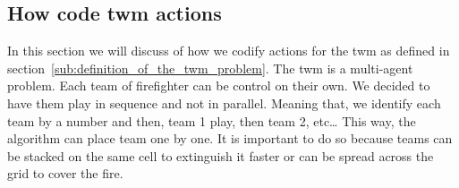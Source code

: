\subsection{How code \acrshort{twm} actions}%
\label{sub:how_code_twm_actions}

In this section we will discuss of how we codify actions for the \gls{twm} as defined in section~\ref{sub:definition_of_the_twm_problem}.
The \gls{twm} is a multi-agent problem. 
Each team of firefighter can be control on their own.
We decided to have them play in sequence and not in parallel.
Meaning that, we identify each team by a number and then, team 1 play, then team 2, etc\dots
This way, the algorithm can place team one by one.
It is important to do so because teams can be stacked on the same cell to extinguish it faster or can be spread across the grid to cover the fire.

